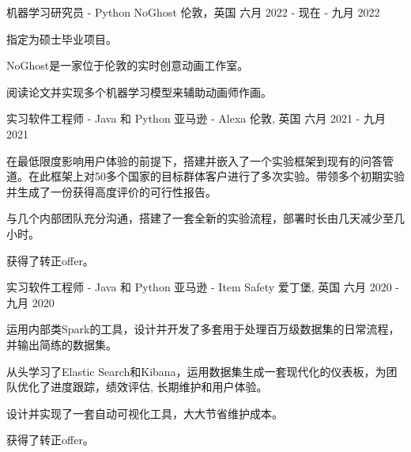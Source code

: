 

\begin{cventries}

    \cventry
    {机器学习研究员 - Python} %
    {NoGhost} %
    {伦敦，英国} %
    {六月 2022 - 现在 - 九月 2022} %
    {
      \begin{cvitems} %
        \item {指定为硕士毕业项目。}
        \item {NoGhost是一家位于伦敦的实时创意动画工作室。}
        \item {阅读论文并实现多个机器学习模型来辅助动画师作画。}
      \end{cvitems}
    }

  \cventry
    {实习软件工程师 - Java 和 Python} %
    {亚马逊 - Alexa} %
    {伦敦, 英国} %
    {六月 2021 - 九月 2021} %
    {
      \begin{cvitems} %
        \item {在最低限度影响用户体验的前提下，搭建并嵌入了一个实验框架到现有的问答管道。在此框架上对50多个国家的目标群体客户进行了多次实验。带领多个初期实验并生成了一份获得高度评价的可行性报告。}
        \item {与几个内部团队充分沟通，搭建了一套全新的实验流程，部署时长由几天减少至几小时。}
        \item {获得了转正offer。}
      \end{cvitems}
    }

  \cventry
    {实习软件工程师 - Java 和 Python} %
    {亚马逊 - Item Safety} %
    {爱丁堡, 英国} %
    {六月 2020 - 九月 2020} %
    {
      \begin{cvitems} %
        \item {运用内部类Spark的工具，设计并开发了多套用于处理百万级数据集的日常流程，并输出简练的数据集。}
        \item {从头学习了Elastic Search和Kibana，运用数据集生成一套现代化的仪表板，为团队优化了进度跟踪，绩效评估, 长期维护和用户体验。}
        \item {设计并实现了一套自动可视化工具，大大节省维护成本。}
        \item {获得了转正offer。}
      \end{cvitems}
    }


\end{cventries}
